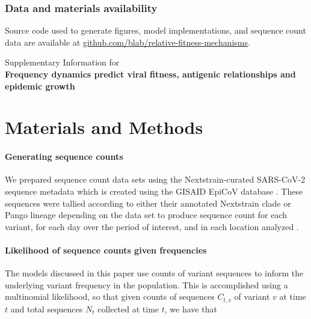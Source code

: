 \documentclass[11pt,oneside,letterpaper]{article}
\begin{document}
\subsubsection*{Data and materials availability}

Source code used to generate figures, model implementations, and sequence count data are available at \href{https://github.com/blab/relative-fitness-mechanisms}{github.com/blab/relative-fitness-mechanisms}.




\newpage

\appendix

\setcounter{figure}{0}
\setcounter{table}{0}
\setcounter{page}{1}
\renewcommand{\thefigure}{S\arabic{figure}}
\renewcommand{\thetable}{S\arabic{table}}
\renewcommand{\thepage}{S\arabic{page}}
\renewcommand{\thesubsection}{S\arabic{subsection}}

\begin{center}\Large
Supplementary Information for \\
\bf Frequency dynamics predict viral fitness, antigenic relationships and epidemic growth
\end{center}

\section*{Materials and Methods}

\paragraph{Generating sequence counts}

We prepared sequence count data sets using the Nextstrain-curated SARS-CoV-2 sequence metadata \cite{Hadfield2018} which is created using the GISAID EpiCoV database \cite{khare2021gisaid}.
These sequences were tallied according to either their annotated Nextstrain clade or Pango lineage depending on the data set to produce sequence count for each variant, for each day over the period of interest, and in each location analyzed \cite{aksamentov2021nextclade}.


\paragraph{Likelihood of sequence counts given frequencies}

The models discussed in this paper use counts of variant sequences to inform the underlying variant frequency in the population.
This is accomplished using a multinomial likelihood, so that given counts of sequences $C_{t,v}$ of variant $v$ at time $t$ and total sequences $N_{t}$ collected at time $t$, we have that
\end{document}
